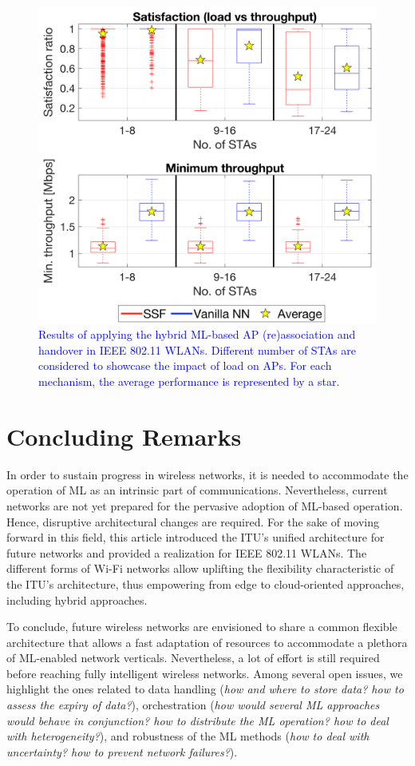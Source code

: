 \documentclass[journal]{IEEEtran}
\begin{document}
\begin{figure}[ht!]
	\centering
	\includegraphics[width=0.9\columnwidth]{results_use_case}
	\caption{\textcolor{blue}{Results of applying the hybrid ML-based AP (re)association and handover in IEEE 802.11 WLANs. Different number of STAs are considered to showcase the impact of load on APs. For each mechanism, the average performance is represented by a star.}}
	\label{fig:results_use_case}
\end{figure}

\section{Concluding Remarks}
In order to sustain progress in wireless networks, it is needed to accommodate the operation of ML as an intrinsic part of communications. Nevertheless, current networks are not yet prepared for the pervasive adoption of ML-based operation. Hence, disruptive architectural changes are required. For the sake of moving forward in this field, this article introduced the ITU's unified architecture for future networks and provided a realization for IEEE 802.11 WLANs. The different forms of Wi-Fi networks allow uplifting the flexibility characteristic of the ITU's architecture, thus empowering from edge to cloud-oriented approaches, including hybrid approaches.

To conclude, future wireless networks are envisioned to share a common flexible architecture that allows a fast adaptation of resources to accommodate a plethora of ML-enabled network verticals. Nevertheless, a lot of effort is still required before reaching fully intelligent wireless networks. Among several open issues, we highlight the ones related to data handling (\textit{how and where to store data? how to assess the expiry of data?}), orchestration (\textit{how would several ML approaches would behave in conjunction? how to distribute the ML operation? how to deal with heterogeneity?}), and robustness of the ML methods (\textit{how to deal with uncertainty? how to prevent network failures?}). 
\end{document}
